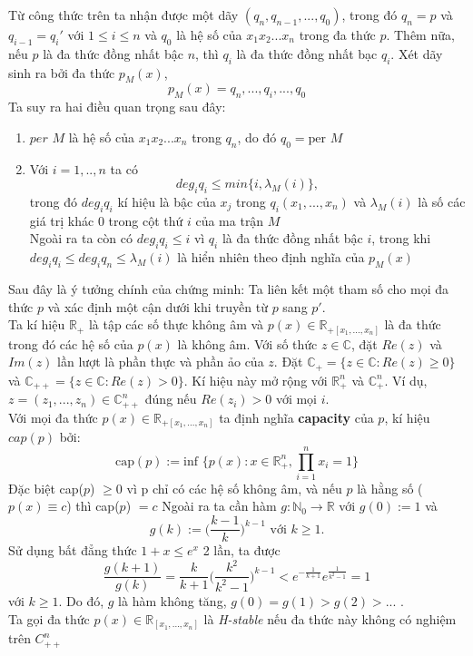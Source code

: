 \documentclass[a4paper, 12pt]{report}
\begin{document}
Từ công thức trên ta nhận được một dãy $(q_n,q_{n-1},...,q_0)$, trong đó $q_n=p$ và $q_{i-1} = q_{i}'$ với $1 \leq i \leq n$ và $q_0$ là hệ số của $x_1x_2...x_n$ trong đa thức $p$. Thêm nữa, nếu $p$ là đa thức đồng nhất bậc $n$, thì $q_i$ là đa thức đồng nhất bạc $q_i$. Xét dãy sinh ra bởi đa thức $p_M(x)$,
\begin{equation*}
p_M(x) = q_n,...,q_i,...,q_0
\end{equation*}
Ta suy ra hai điều quan trọng sau đây: 
\begin{enumerate}[label=\textbf{\Alph*.}]
\item $per$ $M$ là hệ số của $x_1x_2...x_n$ trong $q_n$, do đó $q_0 = \textrm{per }M$
\item Với  $i=1,..,n$ ta có
\begin{equation*}
	deg_{i}q_i \leq min\{i,\lambda_M(i)\},
\end{equation*}
trong đó $deg_{i}q_i $ kí hiệu là bậc của $x_{j}$ trong $q_i(x_1,...,x_n)$ và $\lambda_M(i)$ là số các giá trị khác 0 trong cột thứ $i$ của ma trận $M$ \\
Ngoài ra ta còn có $deg_{i}q_i \leq i$ vì $q_i$ là đa thức đồng nhất bậc $i$, trong khi $deg_{i}q_i \leq deg_{i}q_n \leq \lambda_M(i)$ là hiển nhiên theo định nghĩa của $p_M(x)$
\end{enumerate}
Sau đây là ý tưởng chính của chứng minh: Ta liên kết một tham số cho mọi đa thức $p$ và xác định một cận dưới khi truyền từ $p$ sang $p'$.\\
Ta kí hiệu $\mathbb{R}_{+}$ là tập các số thực không âm và $p(x) \in \mathbb{R}_{+[x_1,...,x_n]}$ là đa thức trong đó các hệ số của $p(x)$ là không âm. Với số thức $z \in \mathbb{C}$, đặt $Re(z)$ và $Im(z)$ lần lượt là phần thực và phần ảo của $z$. Đặt $\mathbb{C}_{+} = \{z \in \mathbb{C}: Re(z) \geq 0\}$ và $\mathbb{C}_{++} = \{z \in \mathbb{C}: Re(z) > 0\}$. Kí hiệu này mở rộng với $\mathbb{R}_{+}^{n}$ và $\mathbb{C}_{+}^{n}$. Ví dụ, $z=(z_1,...,z_n) \in \mathbb{C}_{++}^{n}$ đúng nếu $Re(z_i) >0$ với mọi $i$.\\
Với mọi đa thức $p(x) \in \mathbb{R}_{+[x_1,...,x_n]}$ ta định nghĩa \textbf{capacity} của $p$, kí hiệu $cap(p)$ bởi:
\begin{equation*}
\textrm{cap}(p) := \textrm{inf }\{p(x): x \in \mathbb{R}_{+}^{n}, \displaystyle \prod_{i=1}^{n}x_i = 1 \}
\end{equation*}
Đặc biệt cap($p$) $\geq 0$ vì p chỉ có các hệ số không âm, và nếu $p$ là hằng số ($p(x) \equiv c$) thì cap($p$) $= c$
Ngoài ra ta cần hàm $g: \mathbb{N}_{0} \rightarrow \mathbb{R}$ với $g(0) :=1$ và 
\begin{equation*}
	g(k) := \Big( \frac{k-1}{k} \Big)^{k-1}  \textrm{                   với    } k \geq 1.
\end{equation*}
Sử dụng bất đẳng thức $1 +x \leq e^x$ 2 lần, ta được
\begin{equation*}
	\frac{g(k+1)}{g(k)} = \frac{k}{k+1} \Big( \frac{k^2}{k^2 - 1}\Big) ^{k-1} < e^{-\frac{1}{k+1}}e^{\frac{1}{k^2 - 1}} =1
\end{equation*}
với $k \geq 1$. Do đó, $g$ là hàm không tăng, $g(0) = g(1) > g(2) > ...$ .\\
Ta gọi đa thức $p(x) \in \mathbb{R}_{[x_1,...,x_n]}$ là \textit{H-stable} nếu đa thức này không có nghiệm trên $C_{++}^{n}$
\end{document}
